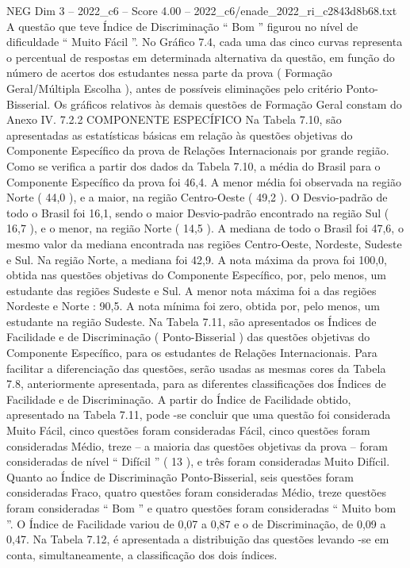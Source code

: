 \begin{textsample}{NEG Dim 3 – 2022\_c6 – Score 4.00 – 2022\_c6/enade\_2022\_ri\_c2843d8b68.txt}
A questão que teve Índice de Discriminação “ Bom ” figurou no nível de dificuldade “ Muito Fácil ”.
No Gráfico 7.4, cada uma das cinco curvas representa o percentual de respostas em determinada alternativa da questão, em função do número de acertos dos estudantes nessa parte da prova ( Formação Geral/Múltipla Escolha ), antes de possíveis eliminações pelo critério Ponto-Bisserial.
Os gráficos relativos às demais questões de Formação Geral constam do Anexo IV. 7.2.2 COMPONENTE ESPECÍFICO Na Tabela 7.10, são apresentadas as estatísticas básicas em relação às questões objetivas do Componente Específico da prova de Relações Internacionais por grande região.
Como se verifica a partir dos dados da Tabela 7.10, a média do Brasil para o Componente Específico da prova foi 46,4.
A menor média foi observada na região Norte ( 44,0 ), e a maior, na região Centro-Oeste ( 49,2 ).
O Desvio-padrão de todo o Brasil foi 16,1, sendo o maior Desvio-padrão encontrado na região Sul ( 16,7 ), e o menor, na região Norte ( 14,5 ).
A mediana de todo o Brasil foi 47,6, o mesmo valor da mediana encontrada nas regiões Centro-Oeste, Nordeste, Sudeste e Sul.
Na região Norte, a mediana foi 42,9.
A nota máxima da prova foi 100,0, obtida nas questões objetivas do Componente Específico, por, pelo menos, um estudante das regiões Sudeste e Sul.
A menor nota máxima foi a das regiões Nordeste e Norte : 90,5.
A nota mínima foi zero, obtida por, pelo menos, um estudante na região Sudeste.
Na Tabela 7.11, são apresentados os Índices de Facilidade e de Discriminação ( Ponto-Bisserial ) das questões objetivas do Componente Específico, para os estudantes de Relações Internacionais.
Para facilitar a diferenciação das questões, serão usadas as mesmas cores da Tabela 7.8, anteriormente apresentada, para as diferentes classificações dos Índices de Facilidade e de Discriminação.
A partir do Índice de Facilidade obtido, apresentado na Tabela 7.11, pode -se concluir que uma questão foi considerada Muito Fácil, cinco questões foram consideradas Fácil, cinco questões foram consideradas Médio, treze – a maioria das questões objetivas da prova – foram consideradas de nível “ Difícil ” ( 13 ), e três foram consideradas Muito Difícil.
Quanto ao Índice de Discriminação Ponto-Bisserial, seis questões foram consideradas Fraco, quatro questões foram consideradas Médio, treze questões foram consideradas “ Bom ” e quatro questões foram consideradas “ Muito bom ”.
O Índice de Facilidade variou de 0,07 a 0,87 e o de Discriminação, de 0,09 a 0,47.
Na Tabela 7.12, é apresentada a distribuição das questões levando -se em conta, simultaneamente, a classificação dos dois índices.

\end{textsample}
